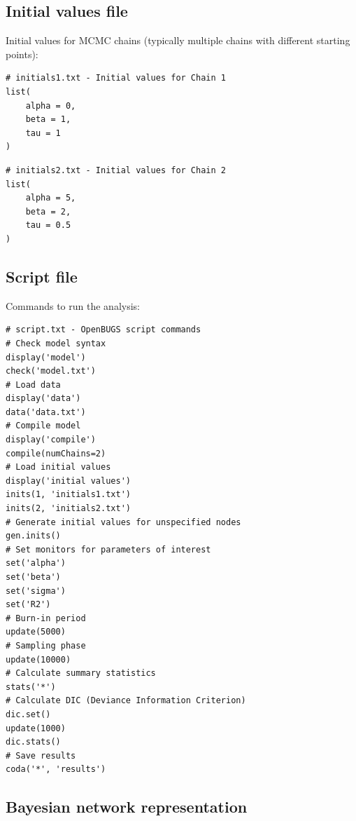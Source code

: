 \subsection{Initial values file}

Initial values for MCMC chains (typically multiple chains with different starting points):
\begin{codebox}
\begin{verbatim}
# initials1.txt - Initial values for Chain 1
list(
    alpha = 0,
    beta = 1,
    tau = 1
)
\end{verbatim}
\end{codebox}

\begin{codebox}
\begin{verbatim}
# initials2.txt - Initial values for Chain 2
list(
    alpha = 5,
    beta = 2,
    tau = 0.5
)
\end{verbatim}
\end{codebox}

\subsection{Script file}

Commands to run the analysis:
{\small
\begin{codebox}
\begin{verbatim}
# script.txt - OpenBUGS script commands
# Check model syntax
display('model')
check('model.txt')
# Load data
display('data')
data('data.txt')
# Compile model
display('compile')
compile(numChains=2)
# Load initial values
display('initial values')
inits(1, 'initials1.txt')
inits(2, 'initials2.txt')
# Generate initial values for unspecified nodes
gen.inits()
# Set monitors for parameters of interest
set('alpha')
set('beta')
set('sigma')
set('R2')
# Burn-in period
update(5000)
# Sampling phase
update(10000)
# Calculate summary statistics
stats('*')
# Calculate DIC (Deviance Information Criterion)
dic.set()
update(1000)
dic.stats()
# Save results
coda('*', 'results')
\end{verbatim}
\end{codebox}
}

\subsection{Bayesian network representation}


